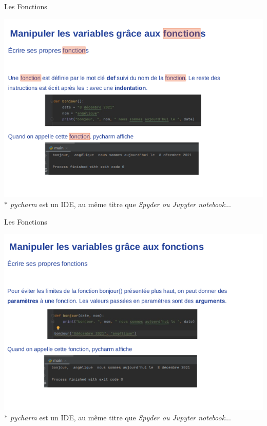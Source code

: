 \begin{frame}{Les Fonctions}

\includegraphics[scale=0.5]{images/fonctions_3.png}
\vspace{-0.3cm}
\footnotesize{$*$ \textit{pycharm} est un IDE, au même titre que \textit{Spyder ou Jupyter notebook}...}
    
\end{frame}

\begin{frame}{Les Fonctions}

\includegraphics[scale=0.5]{images/fonction_3.png}
\vspace{-0.3cm}
\footnotesize{$*$ \textit{pycharm} est un IDE, au même titre que \textit{Spyder ou Jupyter notebook}...}
    
\end{frame}

